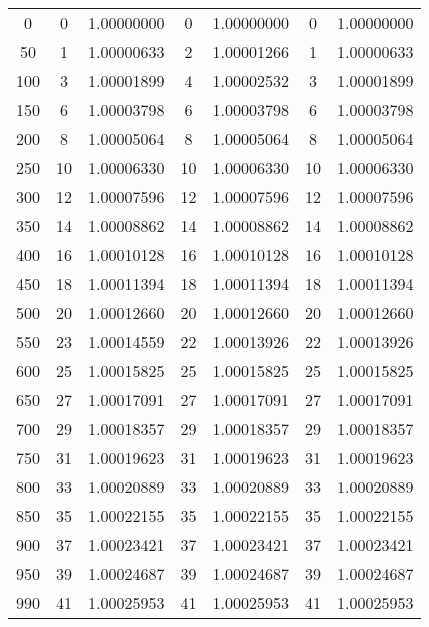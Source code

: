 \begin{table}
\begin{tabular}{S[table-format = 3.0] S[table-format = 2.0] S S[table-format = 2.0] S S[table-format = 2.0] S}
            &  0   &   1.00000000  &  0   & 1.00000000  & 0   &  1.00000000  \\
        50   &  1   &   1.00000633  &  2   & 1.00001266  & 1   &  1.00000633  \\
        100  &  3   &   1.00001899  &  4   & 1.00002532  & 3   &  1.00001899  \\
        150  &  6   &   1.00003798  &  6   & 1.00003798  & 6   &  1.00003798  \\
        200  &  8   &   1.00005064  &  8   & 1.00005064  & 8   &  1.00005064  \\
        250  &  10  &   1.00006330  &  10  & 1.00006330  & 10  &  1.00006330  \\
        300  &  12  &   1.00007596  &  12  & 1.00007596  & 12  &  1.00007596  \\
        350  &  14  &   1.00008862  &  14  & 1.00008862  & 14  &  1.00008862  \\
        400  &  16  &   1.00010128  &  16  & 1.00010128  & 16  &  1.00010128  \\
        450  &  18  &   1.00011394  &  18  & 1.00011394  & 18  &  1.00011394  \\
        500  &  20  &   1.00012660  &  20  & 1.00012660  & 20  &  1.00012660  \\
        550  &  23  &   1.00014559  &  22  & 1.00013926  & 22  &  1.00013926  \\
        600  &  25  &   1.00015825  &  25  & 1.00015825  & 25  &  1.00015825  \\
        650  &  27  &   1.00017091  &  27  & 1.00017091  & 27  &  1.00017091  \\
        700  &  29  &   1.00018357  &  29  & 1.00018357  & 29  &  1.00018357  \\
        750  &  31  &   1.00019623  &  31  & 1.00019623  & 31  &  1.00019623  \\
        800  &  33  &   1.00020889  &  33  & 1.00020889  & 33  &  1.00020889  \\
        850  &  35  &   1.00022155  &  35  & 1.00022155  & 35  &  1.00022155  \\
        900  &  37  &   1.00023421  &  37  & 1.00023421  & 37  &  1.00023421  \\
        950  &  39  &   1.00024687  &  39  & 1.00024687  & 39  &  1.00024687  \\
        990  &  41  &   1.00025953  &  41  & 1.00025953  & 41  &  1.00025953  \\

        \bottomrule

    \end{tabular}
\end{table}

